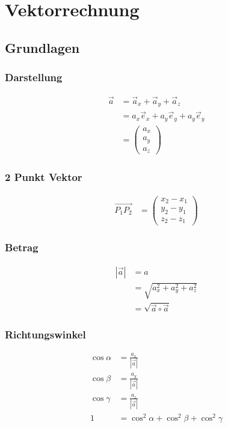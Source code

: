 \section{Vektorrechnung}
\subsection{Grundlagen}

\begin{multicols}{2}
\subsubsection*{Darstellung}
\begin{align*}
\vec{a}	&=\vec{a}_x+\vec{a}_y+\vec{a}_z\\
	&=a_x\vec{e}_x+a_y\vec{e}_y+a_y\vec{e}_y\\
	&=\begin{pmatrix} a_x\\ a_y\\a_z\end{pmatrix}
\end{align*}
\vfill
\subsubsection*{2 Punkt Vektor}
\begin{align*} 
\vec{P_1P_2} &=\begin{pmatrix} x_2-x_1\\ y_2-y_1\\z_2-z_1\end{pmatrix}
\end{align*}
\vfill
\end{multicols}

\begin{multicols}{2}
\subsubsection*{Betrag}
\begin{align*} 
|\vec{a}|	&=a\\
		&=\sqrt{a_x^2+a_y^2+a_z^2}\\
		&=\sqrt{\vec{a}\circ\vec{a}}
\end{align*}
\vfill
\subsubsection*{Richtungswinkel}
\begin{align*} 
\cos \alpha &= \frac{a_x}{|\vec{a}|}\\
\cos \beta &= \frac{a_y}{|\vec{a}|}\\
\cos \gamma &= \frac{a_z}{|\vec{a}|}\\
1&=\cos^2\alpha+\cos^2\beta+\cos^2\gamma
\end{align*}
\vfill
\end{multicols}

